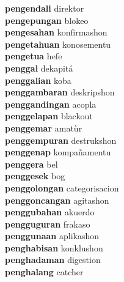 \textbf{pengendali } direktor \\
\textbf{pengepungan } blokeo \\
\textbf{pengesahan } konfirmashon \\
\textbf{pengetahuan } konosementu \\
\textbf{pengetua } hefe \\
\textbf{penggal } dekapitá \\
\textbf{penggalian } koba \\
\textbf{penggambaran } deskripshon \\
\textbf{penggandingan } acopla \\
\textbf{penggelapan } blackout \\
\textbf{penggemar } amatùr \\
\textbf{penggempuran } destrukshon \\
\textbf{penggenap } kompañamentu \\
\textbf{penggera } bel \\
\textbf{penggesek } bog \\
\textbf{penggolongan } categorisacion \\
\textbf{penggoncangan } agitashon \\
\textbf{penggubahan } akuerdo \\
\textbf{pengguguran } frakaso \\
\textbf{penggunaan } aplikashon \\
\textbf{penghabisan } konklushon \\
\textbf{penghadaman } digestion \\
\textbf{penghalang } catcher \\
